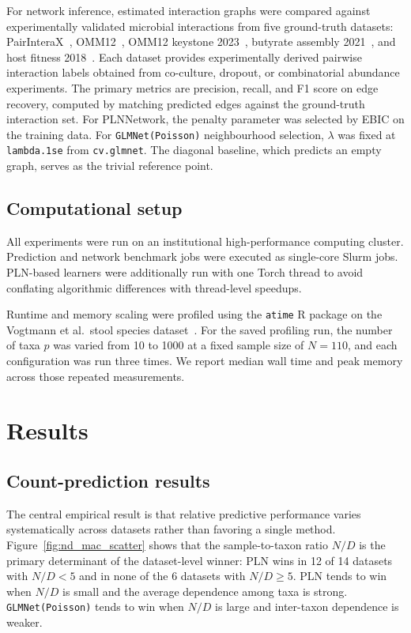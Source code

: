 \documentclass[Review,doublespace,sageh,times]{sagej}
\begin{document}
For network inference, estimated interaction graphs were compared against experimentally validated microbial interactions from five ground-truth datasets: PairInteraX~\citep{Zhu2025PairInteraX}, OMM12~\citep{Weiss2022OMM12}, OMM12 keystone 2023~\citep{Weiss2023Keystone}, butyrate assembly 2021~\citep{Clark2021Butyrate}, and host fitness 2018~\citep{Gould2018HostFitness}.
Each dataset provides experimentally derived pairwise interaction labels obtained from co-culture, dropout, or combinatorial abundance experiments.
The primary metrics are precision, recall, and F1 score on edge recovery, computed by matching predicted edges against the ground-truth interaction set.
For PLNNetwork, the penalty parameter was selected by EBIC on the training data.
For \texttt{GLMNet(Poisson)} neighbourhood selection, $\lambda$ was fixed at \texttt{lambda.1se} from \texttt{cv.glmnet}.
The diagonal baseline, which predicts an empty graph, serves as the trivial reference point.

\subsection{Computational setup}
\label{subsec:computational-setup}

All experiments were run on an institutional high-performance computing cluster.
Prediction and network benchmark jobs were executed as single-core Slurm jobs.
PLN-based learners were additionally run with one Torch thread to avoid conflating algorithmic differences with thread-level speedups.

Runtime and memory scaling were profiled using the \texttt{atime} R package on the Vogtmann et al.\ stool species dataset~\citep{Vogtmann2016CRC}.
For the saved profiling run, the number of taxa $p$ was varied from 10 to 1000 at a fixed sample size of $N=110$, and each configuration was run three times.
We report median wall time and peak memory across those repeated measurements.


\section{Results}
\subsection{Count-prediction results}

The central empirical result is that relative predictive performance varies systematically across datasets rather than favoring a single method.
Figure~\ref{fig:nd_mac_scatter} shows that the sample-to-taxon ratio $N/D$ is the primary determinant of the dataset-level winner: PLN wins in 12 of 14 datasets with $N/D < 5$ and in none of the 6 datasets with $N/D \geq 5$.
PLN tends to win when $N/D$ is small and the average dependence among taxa is strong.
\texttt{GLMNet(Poisson)} tends to win when $N/D$ is large and inter-taxon dependence is weaker.
\end{document}
